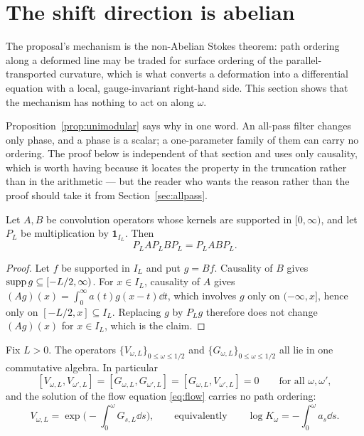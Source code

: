 \section{The shift direction is abelian}\label{sec:abelian}

The proposal's mechanism is the non-Abelian Stokes theorem: path ordering along a
deformed line may be traded for surface ordering of the parallel-transported
curvature, which is what converts a deformation into a differential equation with
a local, gauge-invariant right-hand side. This section shows that the mechanism
has nothing to act on along $\omega$.

Proposition~\ref{prop:unimodular} says why in one word. An all-pass filter
changes only phase, and a phase is a scalar; a one-parameter family of them can
carry no ordering. The proof below is independent of that section and uses only
causality, which is worth having because it locates the property in the
truncation rather than in the arithmetic --- but the reader who wants the reason
rather than the proof should take it from Section~\ref{sec:allpass}.

\begin{lemma}\label{lem:multiplicative}
Let $A,B$ be convolution operators whose kernels are supported in $[0,\infty)$,
and let $P_L$ be multiplication by $\mathbf1_{I_L}$. Then
\[
 P_LAP_LBP_L=P_LABP_L .
\]
\end{lemma}

\begin{proof}
Let $f$ be supported in $I_L$ and put $g=Bf$. Causality of $B$ gives
$\operatorname{supp} g\subseteq[-L/2,\infty)$. For $x\in I_L$, causality of $A$ gives
$(Ag)(x)=\int_0^\infty a(t)g(x-t)\dd t$, which involves $g$ only on
$(-\infty,x]$, hence only on $[-L/2,x]\subseteq I_L$. Replacing $g$ by
$P_Lg$ therefore does not change $(Ag)(x)$ for $x\in I_L$, which is the claim.
\end{proof}

\begin{theorem}\label{thm:abelian}
Fix $L>0$. The operators $\{V_{\omega,L}\}_{0\leq\omega\leq1/2}$ and
$\{G_{\omega,L}\}_{0\leq\omega\leq1/2}$ all lie in one commutative algebra. In
particular
\[
 [V_{\omega,L},V_{\omega',L}]=[G_{\omega,L},G_{\omega',L}]
 =[G_{\omega,L},V_{\omega',L}]=0
 \qquad\text{for all }\omega,\omega' ,
\]
and the solution of the flow equation \eqref{eq:flow} carries no path ordering:
\begin{equation}\label{eq:exp}
 V_{\omega,L}=\exp\Big(-\int_0^\omega G_{s,L}\dd s\Big),
 \qquad\text{equivalently}\qquad
 \log K_\omega=-\int_0^\omega a_s\dd s .
\end{equation}
\end{theorem}

